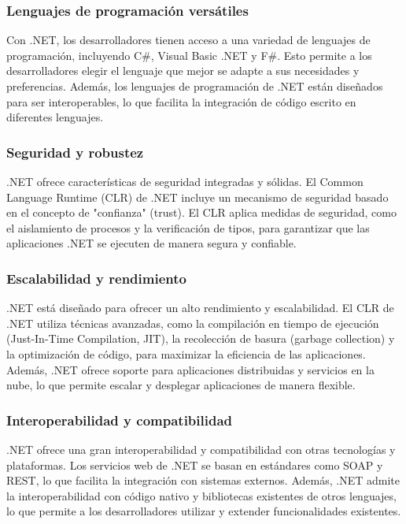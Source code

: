 \documentclass[executivepaper]{article}
\begin{document}
\subsubsection*{Lenguajes de programación versátiles}
Con .NET, los desarrolladores tienen acceso a una variedad de lenguajes de programación, incluyendo C\#, Visual Basic .NET y F\#. Esto permite a los desarrolladores elegir el lenguaje que mejor se adapte a sus necesidades y preferencias. Además, los lenguajes de programación de .NET están diseñados para ser interoperables, lo que facilita la integración de código escrito en diferentes lenguajes.

\subsubsection*{Seguridad y robustez}
.NET ofrece características de seguridad integradas y sólidas. El Common Language Runtime (CLR) de .NET incluye un mecanismo de seguridad basado en el concepto de "confianza" (trust). El CLR aplica medidas de seguridad, como el aislamiento de procesos y la verificación de tipos, para garantizar que las aplicaciones .NET se ejecuten de manera segura y confiable.

\subsubsection*{Escalabilidad y rendimiento}
.NET está diseñado para ofrecer un alto rendimiento y escalabilidad. El CLR de .NET utiliza técnicas avanzadas, como la compilación en tiempo de ejecución (Just-In-Time Compilation, JIT), la recolección de basura (garbage collection) y la optimización de código, para maximizar la eficiencia de las aplicaciones. Además, .NET ofrece soporte para aplicaciones distribuidas y servicios en la nube, lo que permite escalar y desplegar aplicaciones de manera flexible.

\subsubsection*{Interoperabilidad y compatibilidad}
.NET ofrece una gran interoperabilidad y compatibilidad con otras tecnologías y plataformas. Los servicios web de .NET se basan en estándares como SOAP y REST, lo que facilita la integración con sistemas externos. Además, .NET admite la interoperabilidad con código nativo y bibliotecas existentes de otros lenguajes, lo que permite a los desarrolladores utilizar y extender funcionalidades existentes.
\end{document}
